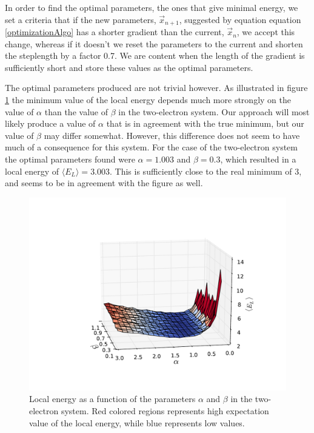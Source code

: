 \documentclass[english, a4paper]{article}
\newcommand\bk[1]{\langle#1\rangle}
\begin{document}
	In order to find the optimal parameters, the ones that give minimal energy, we set a criteria that if the new parameters, $\vec{x}_{n+1}$, suggested by equation equation \ref{optimizationAlgo} has a shorter gradient than the current, $\vec{x}_n$, we accept this change, whereas if it doesn't we reset the parameters to the current and shorten the steplength by a factor 0.7. We are content when the length of the gradient is sufficiently short and store these values as the optimal parameters. 
	
	The optimal parameters produced are not trivial however. As illustrated in figure \ref{fig:energyPlot15x15N2} the minimum value of the local energy depends much more strongly on the value of $\alpha$ than the value of $\beta$ in the two-electron system. Our approach will most likely produce a value of $\alpha$ that is in agreement with the true minimum, but our value of $\beta$ may differ somewhat. However, this difference does not seem to have much of a consequence for this system. For the case of the two-electron system the optimal parameters found were $\alpha=1.003$ and $\beta=0.3$, which resulted in a local energy of $\bk{E_L} = 3.003$. This is sufficiently close to the real minimum of 3, and seems to be in agreement with the figure as well.
	
	
	
\begin{figure}[H]
\centering
\includegraphics[width=0.8\linewidth, trim={0 2cm 0 4.5cm}, clip]{figures/energySurface/energyPlot15x15N2}
\caption{Local energy as a function of the parameters $\alpha$ and $\beta$ in the two-electron system. Red colored regions represents high expectation value of the local energy, while blue represents low values.}
\label{fig:energyPlot15x15N2}
\end{figure}
	
\end{document}
